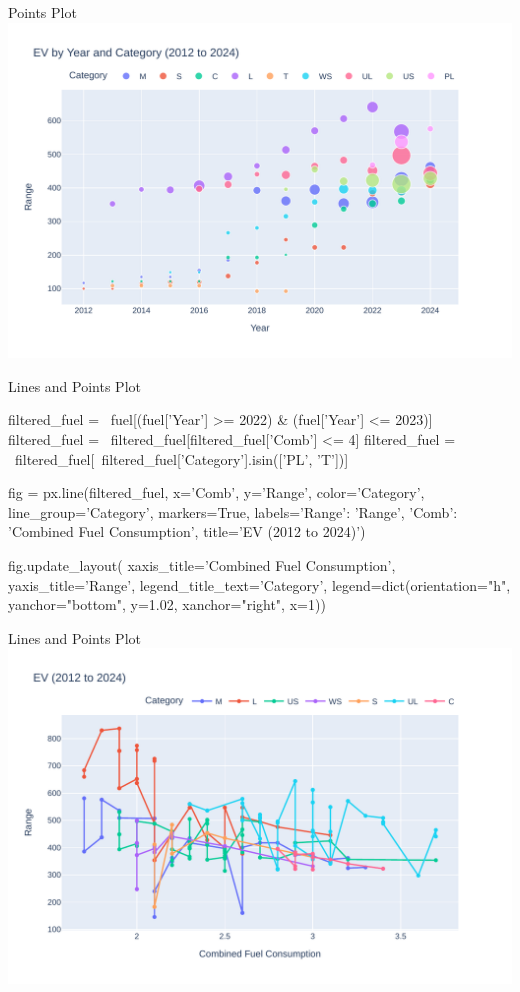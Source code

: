 \documentclass[ignorenonframetext,xcolor=x11names]{beamer}
\begin{document}
\begin{frame}{Points Plot}
  \includegraphics[width=\textwidth]{px.fuel.pointsSize.pdf}
\end{frame}

\begin{frame}[fragile]{Lines and Points Plot}
\footnotesize
\begin{pythoncode}
filtered_fuel = \
    fuel[(fuel['Year'] >= 2022) & 
         (fuel['Year'] <= 2023)]
filtered_fuel = \
    filtered_fuel[filtered_fuel['Comb'] <= 4]
filtered_fuel = \
    filtered_fuel[~filtered_fuel['Category'].isin(['PL', 'T'])]

fig = px.line(filtered_fuel, 
    x='Comb', y='Range', color='Category', 
    line_group='Category', markers=True, 
    labels={'Range': 'Range', 'Comb': 'Combined Fuel Consumption'},
    title='EV (2012 to 2024)')

fig.update_layout(
    xaxis_title='Combined Fuel Consumption',
    yaxis_title='Range',
    legend_title_text='Category',
    legend=dict(orientation="h", yanchor="bottom", 
                y=1.02, xanchor="right", x=1))
\end{pythoncode}
\end{frame}

\begin{frame}{Lines and Points Plot}
  \includegraphics[width=\textwidth]{px.fuel.linesPoints.pdf}
\end{frame}
\end{document}
